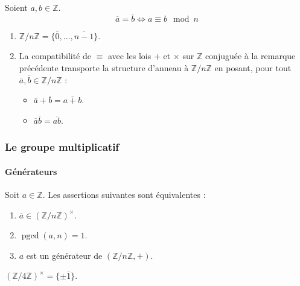   \begin{remark}
    Soient $a, b \in \mathbb{Z}$.
    \[ \overline{a} = \overline{b} \iff a \equiv b \mod n \]
  \end{remark}

  \begin{proposition}
    \begin{enumerate}[label=(\roman*)]
      \item $\mathbb{Z}/n\mathbb{Z} = \{ \overline{0}, \dots, \overline{n-1} \}$.
      \item La compatibilité de $\equiv$ avec les lois $+$ et $\times$ sur $\mathbb{Z}$ conjuguée à la remarque précédente transporte la structure d'anneau à $\mathbb{Z}/n\mathbb{Z}$ en posant, pour tout $\overline{a}, \overline{b} \in \mathbb{Z}/n\mathbb{Z}$ :
      \begin{itemize}
        \item $\overline{a} + \overline{b} = \overline{a+b}$.
        \item $\overline{a} \overline{b} = \overline{ab}$.
      \end{itemize}
    \end{enumerate}
  \end{proposition}

  \subsubsection{Le groupe multiplicatif}

  \paragraph{Générateurs}


  \begin{theorem}
    \label{120-2}
    Soit $a \in \mathbb{Z}$. Les assertions suivantes sont équivalentes :
    \begin{enumerate}[label=(\roman*)]
      \item $\overline{a} \in (\mathbb{Z}/n\mathbb{Z})^\times$.
      \item $\operatorname{pgcd}(a,n)=1$.
      \item $a$ est un générateur de $(\mathbb{Z}/n\mathbb{Z}, +)$.
    \end{enumerate}
  \end{theorem}


  \begin{example}
    \label{120-3}
    $(\mathbb{Z}/4\mathbb{Z})^\times = \{ \pm \overline{1} \}$.
  \end{example}


